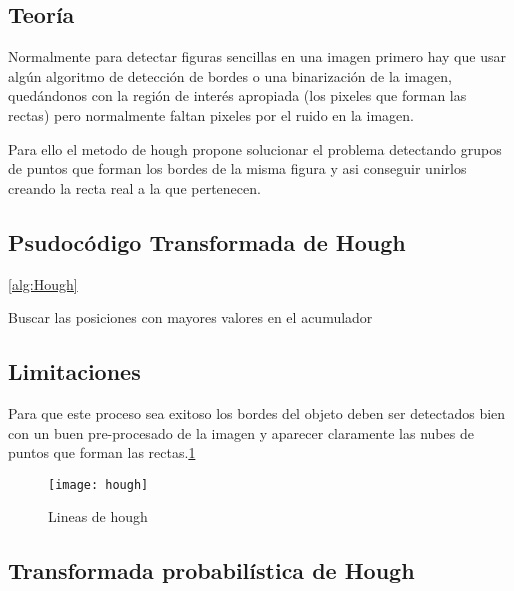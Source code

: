 \subsection{Teoría}

Normalmente para detectar figuras sencillas en una imagen primero hay que usar algún algoritmo de detección de bordes o una binarización de la imagen, quedándonos con la región de interés apropiada (los pixeles que forman las rectas) pero normalmente faltan pixeles por el ruido en la imagen.

Para ello el metodo de hough propone solucionar el problema detectando grupos de puntos que forman los bordes de la misma figura y asi conseguir unirlos creando la recta real a la que pertenecen.

\subsection{Psudocódigo Transformada de Hough}
\ref{alg:Hough}

\begin{algorithm*}
\DontPrintSemicolon
{}


Buscar las posiciones con mayores valores en el acumulador\;	

\label{alg:Hough}
\end{algorithm*}

\subsection{Limitaciones}
Para que este proceso sea exitoso los bordes del objeto deben ser detectados bien con un buen pre-procesado de la imagen y aparecer claramente las nubes de puntos que forman las rectas.\ref{fig:3.5}

\begin{figure}[h]
\centering
\texttt{[image: hough]}
\caption{Lineas de hough\cite{opencv:houghIm}}
\label{fig:3.5}
\end{figure}
\subsection{Transformada probabilística de Hough}



